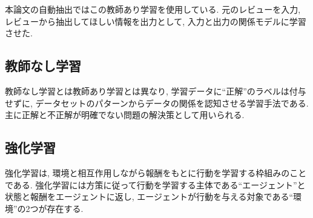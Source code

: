 本論文の自動抽出ではこの教師あり学習を使用している. 元のレビューを入力, レビューから抽出してほしい情報を出力として, 入力と出力の関係モデルに学習させた.

\subsection{教師なし学習}
教師なし学習とは教師あり学習とは異なり, 学習データに``正解''のラベルは付与せずに, データセットのパターンからデータの関係を認知させる学習手法である. 主に正解と不正解が明確でない問題の解決策として用いられる. 


\subsection{強化学習}
強化学習は, 環境と相互作用しながら報酬をもとに行動を学習する枠組みのことである. 強化学習には方策に従って行動を学習する主体である``エージェント''と状態と報酬をエージェントに返し, エージェントが行動を与える対象である``環境''の2つが存在する. 






